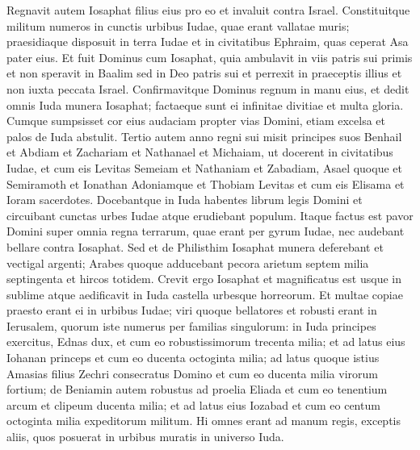 \begin{biblechapter}  
\verse Regnavit autem Iosaphat filius eius pro eo et invaluit contra Israel.  
\verse Constituitque militum numeros in cunctis urbibus Iudae, quae erant vallatae muris; praesidiaque disposuit in terra Iudae et in civitatibus Ephraim, quas ceperat Asa pater eius. 
\verse Et fuit Dominus cum Iosaphat, quia ambulavit in viis patris sui primis et non speravit in Baalim 
\verse sed in Deo patris sui et perrexit in praeceptis illius et non iuxta peccata Israel. 
\verse Confirmavitque Dominus regnum in manu eius, et dedit omnis Iuda munera Iosaphat; factaeque sunt ei infinitae divitiae et multa gloria. 
\verse Cumque sumpsisset cor eius audaciam propter vias Domini, etiam excelsa et palos de Iuda abstulit. 
\verse Tertio autem anno regni sui misit principes suos Benhail et Abdiam et Zachariam et Nathanael et Michaiam, ut docerent in civitatibus Iudae, 
\verse et cum eis Levitas Semeiam et Nathaniam et Zabadiam, Asael quoque et Semiramoth et Ionathan Adoniamque et Thobiam Levitas et cum eis Elisama et Ioram sacerdotes.  
\verse Docebantque in Iuda habentes librum legis Domini et circuibant cunctas urbes Iudae atque erudiebant populum. 
\verse Itaque factus est pavor Domini super omnia regna terrarum, quae erant per gyrum Iudae, nec audebant bellare contra Iosaphat. 
\verse Sed et de Philisthim Iosaphat munera deferebant et vectigal argenti; Arabes quoque adducebant pecora arietum septem milia septingenta et hircos totidem. 
\verse Crevit ergo Iosaphat et magnificatus est usque in sublime atque aedificavit in Iuda castella urbesque horreorum. 
\verse Et multae copiae praesto erant ei in urbibus Iudae; viri quoque bellatores et robusti erant in Ierusalem, 
\verse quorum iste numerus per familias singulorum: in Iuda principes exercitus, Ednas dux, et cum eo robustissimorum trecenta milia; 
\verse et ad latus eius Iohanan princeps et cum eo ducenta octoginta milia; 
\verse ad latus quoque istius Amasias filius Zechri consecratus Domino et cum eo ducenta milia virorum fortium; 
\verse de Beniamin autem robustus ad proelia Eliada et cum eo tenentium arcum et clipeum ducenta milia; 
\verse et ad latus eius Iozabad et cum eo centum octoginta milia expeditorum militum. 
\verse Hi omnes erant ad manum regis, exceptis aliis, quos posuerat in urbibus muratis in universo Iuda. 
\end{biblechapter}

